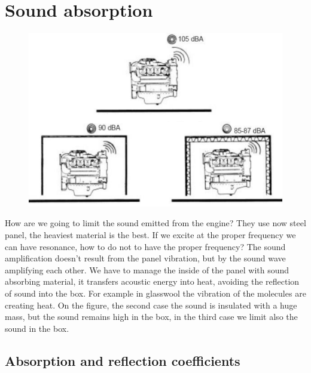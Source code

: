 
\chapter{Sound absorption}
	\begin{figure}
	\vspace{-5mm}
	\includegraphics[scale=0.2]{acoustics/ch4/1}
	\label{fig:4.1}
	\end{figure}
	How are we going to limit the sound emitted from the engine? They use now steel panel, the heaviest material is the best. If we excite at the proper frequency we can have resonance, how to do not to have the proper frequency? The sound amplification doesn't result from the panel vibration, but by the sound wave amplifying each other. We have to manage the inside of the panel with sound absorbing material, it transfers acoustic energy into heat, avoiding the reflection of sound into the box. For example in glasswool the vibration of the molecules are creating heat. On the figure, the second case the sound is insulated with a huge mass, but the sound remains high in the box, in the third case we limit also the sound in the box. 
	
\section{Absorption and reflection coefficients}
	
